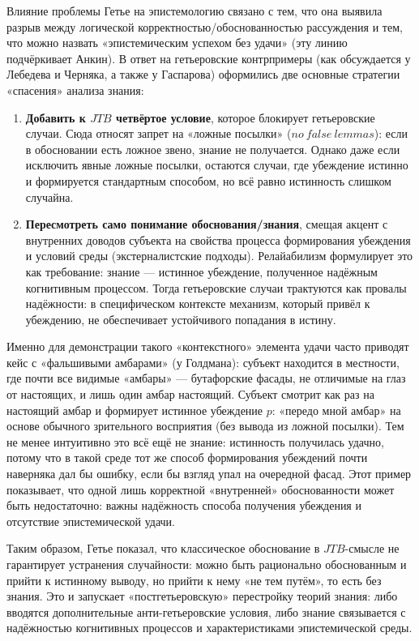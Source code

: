 \documentclass[a4paper,12pt]{article}
\begin{document}
Влияние проблемы Гетье на эпистемологию связано с тем, что она выявила разрыв между логической корректностью/обоснованностью рассуждения и тем, что можно назвать «эпистемическим успехом без удачи» (эту линию подчёркивает Анкин). В ответ на гетьеровские контрпримеры (как обсуждается у Лебедева и Черняка, а также у Гаспарова) оформились две основные стратегии «спасения» анализа знания:
\begin{enumerate}
    \item \textbf{Добавить к $JTB$ четвёртое условие}, которое блокирует гетьеровские случаи. Сюда относят запрет на «ложные посылки» ($no\ false\ lemmas$): если в обосновании есть ложное звено, знание не получается. Однако даже если исключить явные ложные посылки, остаются случаи, где убеждение истинно и формируется стандартным способом, но всё равно истинность слишком случайна.
    \item \textbf{Пересмотреть само понимание обоснования/знания}, смещая акцент с внутренних доводов субъекта на свойства процесса формирования убеждения и условий среды (экстерналистские подходы). Релайабилизм формулирует это как требование: знание --- истинное убеждение, полученное надёжным когнитивным процессом. Тогда гетьеровские случаи трактуются как провалы надёжности: в специфическом контексте механизм, который привёл к убеждению, не обеспечивает устойчивого попадания в истину.
\end{enumerate}

Именно для демонстрации такого «контекстного» элемента удачи часто приводят кейс с «фальшивыми амбарами» (у Голдмана): субъект находится в местности, где почти все видимые «амбары» --- бутафорские фасады, не отличимые на глаз от настоящих, и лишь один амбар настоящий. Субъект смотрит как раз на настоящий амбар и формирует истинное убеждение $p$: «передо мной амбар» на основе обычного зрительного восприятия (без вывода из ложной посылки). Тем не менее интуитивно это всё ещё не знание: истинность получилась удачно, потому что в такой среде тот же способ формирования убеждений почти наверняка дал бы ошибку, если бы взгляд упал на очередной фасад. Этот пример показывает, что одной лишь корректной «внутренней» обоснованности может быть недостаточно: важны надёжность способа получения убеждения и отсутствие эпистемической удачи.

Таким образом, Гетье показал, что классическое обоснование в $JTB$-смысле не гарантирует устранения случайности: можно быть рационально обоснованным и прийти к истинному выводу, но прийти к нему «не тем путём», то есть без знания. Это и запускает «постгетьеровскую» перестройку теорий знания: либо вводятся дополнительные анти-гетьеровские условия, либо знание связывается с надёжностью когнитивных процессов и характеристиками эпистемической среды.
\end{document}
